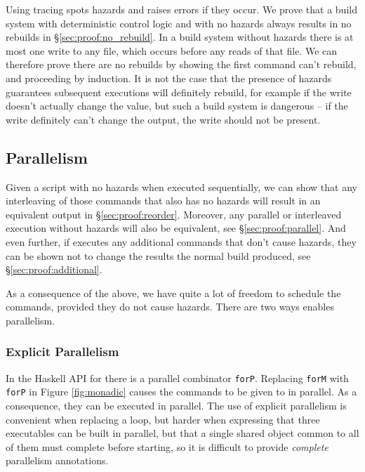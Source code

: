 Using tracing \Rattle spots hazards and raises errors if they occur. We prove that a build system with deterministic control logic and with no hazards always results in no rebuilds in \S\ref{sec:proof:no_rebuild}. In a build system without hazards there is at most one write to any file, which occurs before any reads of that file. We can therefore prove there are no rebuilds by showing the first command can't rebuild, and proceeding by induction. It is not the case that the presence of hazards guarantees subsequent executions will definitely rebuild, for example if the write doesn't actually change the value, but such a build system is dangerous -- if the write definitely can't change the output, the write should not be present.

\subsection{Parallelism}

Given a script with no hazards when executed sequentially, we can show that any interleaving of those commands that also has no hazards will result in an equivalent output in \S\ref{sec:proof:reorder}. Moreover, any parallel or interleaved execution without hazards will also be equivalent, see \S\ref{sec:proof:parallel}. And even further, if \Rattle executes any additional commands that don't cause hazards, they can be shown not to change the results the normal build produced, see \S\ref{sec:proof:additional}.

As a consequence of the above, we have quite a lot of freedom to schedule the commands, provided they do not cause hazards.  There are two ways \Rattle enables parallelism.

\subsubsection{Explicit Parallelism}

In the Haskell API for \Rattle there is a parallel combinator \texttt{forP}. Replacing \texttt{forM} with \texttt{forP} in Figure \ref{fig:monadic} causes the commands to be given to \Rattle in parallel. As a consequence, they can be executed in parallel. The use of explicit parallelism is convenient when replacing a loop, but harder when expressing that three executables can be built in parallel, but that a single shared object common to all of them must complete before starting, so it is difficult to provide \emph{complete} parallelism annotations.

